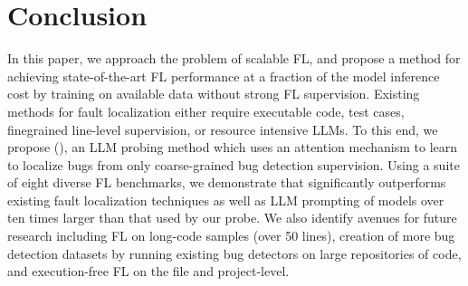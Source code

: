 \section{Conclusion}
In this paper, we approach the problem of scalable FL, and propose a method for achieving state-of-the-art FL performance at a fraction of the model inference cost by training on available data without strong FL supervision.
Existing methods for fault localization either require executable code, test cases, finegrained line-level supervision, or resource intensive LLMs.
To this end, we propose \ourmethodlong{} (\ourmethod{}), an LLM probing method which uses an attention mechanism to learn to localize bugs from only coarse-grained bug detection supervision.
Using a suite of eight diverse FL benchmarks, we demonstrate that \ourmethod{} significantly outperforms existing fault localization techniques as well as LLM prompting of models over ten times larger than that used by our probe.
We also identify avenues for future research including FL on long-code samples (over 50 lines), creation of more bug detection datasets by running existing bug detectors on large repositories of code, and execution-free FL on the file and project-level.
